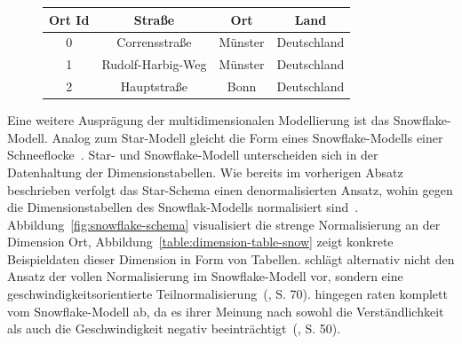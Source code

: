 \documentclass[
  language=german, %
  type=bachelor%
]{isthesis}
\begin{document}
\begin{content}
  \begin{figure}[caption={Beispiel der Dimensionstabelle \textit{Ort} im Star-Schema}, label={table:dimension-table}]
    \footnotesize
    \begin{tabular}{c c c c}
      Ort Id & Straße & Ort & Land \\
      \toprule
      0 & Corrensstraße & Münster & Deutschland \\
      1 & Rudolf-Harbig-Weg & Münster & Deutschland \\
      2 & Hauptstraße & Bonn & Deutschland \\
    \end{tabular}
  \end{figure}

  Eine weitere Ausprägung der multidimensionalen Modellierung ist das Snowflake-Modell.
  Analog zum Star-Modell gleicht die Form eines Snowflake-Modells einer
  Schneeflocke~\cite[][S. 70]{Kemper2010}. Star- und Snowflake-Modell
  unterscheiden sich in der Datenhaltung der Dimensionstabellen. Wie bereits im
  vorherigen Absatz beschrieben verfolgt das Star-Schema einen denormalisierten
  Ansatz, wohin gegen die Dimensionstabellen des Snowflak-Modells normalisiert
  sind~\cite[][S. 70]{Kemper2010}. Abbildung~\ref{fig:snowflake-schema}
  visualisiert die strenge Normalisierung an der Dimension Ort,
  Abbildung~\ref{table:dimension-table-snow} zeigt konkrete Beispieldaten dieser
  Dimension in Form von Tabellen.  \textsc{\citeauthor{Kemper2010}} schlägt alternativ
  nicht den Ansatz der vollen Normalisierung im Snowflake-Modell vor, sondern eine
  geschwindigkeitsorientierte Teilnormalisierung~(\citeyear{Kemper2010}, S. 70).
  \textsc{\citeauthor{Kimball2013}} hingegen raten komplett vom Snowflake-Modell
  ab, da es ihrer Meinung nach sowohl die Verständlichkeit als auch \ggf{} die
  Geschwindigkeit negativ beeinträchtigt~(\citeyear{Kimball2013}, S. 50).

  \begin{figure}[caption={Teilausschnitt eines Snowflake-Schema}, label={fig:snowflake-schema}]
    \resizebox{250pt}{!}{}
  \end{figure}


\end{content}
\end{document}
